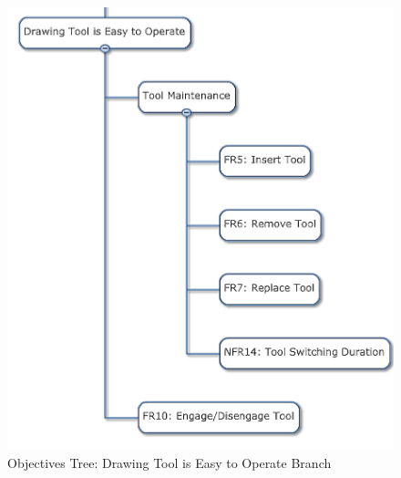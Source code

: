 \begin{figure}[!ht]
\centering
\includegraphics[width=0.98\columnwidth]{figs/objectives_tree/objectives_tree_easy_tool_ops.png}
\caption{Objectives Tree: Drawing Tool is Easy to Operate Branch}
\label{fig:obj_tree_tool}
\end{figure}

